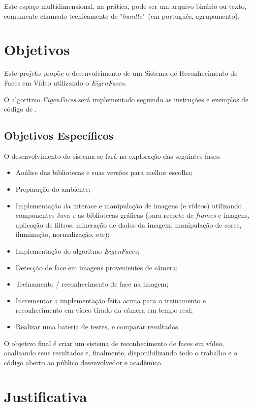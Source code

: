 Este espaço multidimensional, na prática, pode ser um arquivo binário ou texto, comumente chamado tecnicamente de "\textit{bundle}"\ (em português, agrupamento).

\section{Objetivos}\label{sec:objetivos}
Este projeto propõe o desenvolvimento de um Sistema de Reconhecimento de Faces em Vídeo utilizando o  \textit{EigenFaces}.

O algoritmo \textit{EigenFaces} será implementado seguindo as instruções e exemplos de código de .  

\subsection{Objetivos Específicos}\label{sec:organizacao-trabalho}

O desenvolvimento do sistema se fará na exploração das seguintes fases:

\begin{itemize}
	\item Análise das bibliotecas e suas versões para melhor escolha;
	\item Preparação do ambiente;
	\item Implementação da interace e manipulação de imagens (e vídeos)  utilizando componentes Java e as bibliotecas gráficas (para  recorte de \textit{frames} e imagens, aplicação de filtros, mineração de dados da imagem, manipulação de cores, iluminação, normalização, etc);
	\item Implementação do algoritmo \textit{EigenFaces};
	\item Detecção de face em imagens provenientes de câmera;
	\item Treinamento / reconhecimento de face na imagem;
	\item Incrementar a implementação feita acima para o treinamento  e reconhecimento em vídeo tirado da câmera em tempo real;
	\item Realizar uma bateria de testes, e comparar resultados.
\end{itemize}

O objetivo final é criar um sistema de reconhecimento de faces em vídeo, analisando seus resultados e, finalmente, disponibilizando todo o trabalho e o código aberto ao público desenvolvedor e acadêmico.


\section{Justificativa} 

